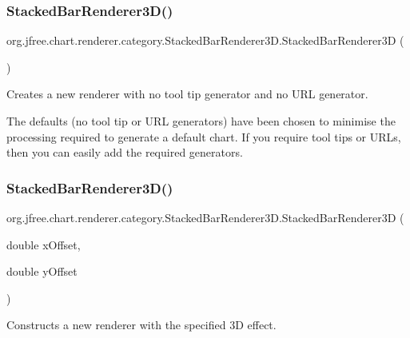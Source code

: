 \subsubsection{\texorpdfstring{Stacked\+Bar\+Renderer3\+D()}{StackedBarRenderer3D()}\hspace{0.1cm}{\footnotesize\ttfamily [1/4]}}
{\footnotesize\ttfamily org.\+jfree.\+chart.\+renderer.\+category.\+Stacked\+Bar\+Renderer3\+D.\+Stacked\+Bar\+Renderer3D (\begin{DoxyParamCaption}{ }\end{DoxyParamCaption})}

Creates a new renderer with no tool tip generator and no U\+RL generator. 

The defaults (no tool tip or U\+RL generators) have been chosen to minimise the processing required to generate a default chart. If you require tool tips or U\+R\+Ls, then you can easily add the required generators. \mbox{\label{classorg_1_1jfree_1_1chart_1_1renderer_1_1category_1_1_stacked_bar_renderer3_d_aa29facd6a2f582736060606b77d02449}} 
\subsubsection{\texorpdfstring{Stacked\+Bar\+Renderer3\+D()}{StackedBarRenderer3D()}\hspace{0.1cm}{\footnotesize\ttfamily [2/4]}}
{\footnotesize\ttfamily org.\+jfree.\+chart.\+renderer.\+category.\+Stacked\+Bar\+Renderer3\+D.\+Stacked\+Bar\+Renderer3D (\begin{DoxyParamCaption}\item[{double}]{x\+Offset,  }\item[{double}]{y\+Offset }\end{DoxyParamCaption})}

Constructs a new renderer with the specified \textquotesingle{}3D effect\textquotesingle{}.


